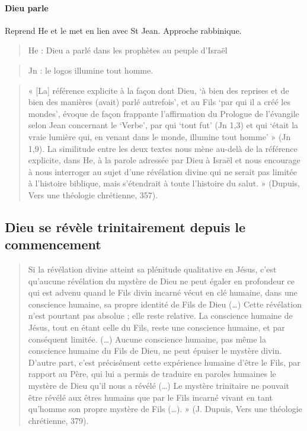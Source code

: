 \paragraph{Dieu parle} Reprend He et le met en lien avec St Jean. Approche rabbinique. 
\begin{quote}
    He : Dieu a parlé dans les prophètes au peuple d'Israël
\end{quote}
\begin{quote}
    Jn : le logos illumine tout homme. 
\end{quote}


 \begin{quote}
 
« [La] référence explicite à la façon dont Dieu, ‘à bien des reprises et de bien des manières (avait)
parlé autrefois’, et au Fils ‘par qui il a créé les mondes’, évoque de façon frappante l’affirmation du
Prologue de l’évangile selon Jean concernant le ‘Verbe’, par qui ‘tout fut’ (Jn 1,3) et qui ‘était la vraie
lumière qui, en venant dans le monde, illumine tout homme’ » (Jn 1,9). La similitude entre les deux
textes nous mène au-delà de la référence explicite, dans He, à la parole adressée par Dieu à Israël et
nous encourage à nous interroger au sujet d’une révélation divine qui ne serait pas limitée à l’histoire
biblique, mais s’étendrait à toute l’histoire du salut. » (Dupuis, Vers une théologie chrétienne, 357).
 \end{quote}







 
\subsection{Dieu se révèle trinitairement depuis le commencement}


\begin{quote}
    Si la révélation divine atteint sa plénitude qualitative en Jésus, c’est qu’aucune révélation du mystère
de Dieu ne peut égaler en profondeur ce qui est advenu quand le Fils divin incarné vécut en clé
humaine, dans une conscience humaine, sa propre identité de Fils de Dieu (…) Cette révélation n’est
pourtant pas absolue ; elle reste relative. La conscience humaine de Jésus, tout en étant celle du Fils,
reste une conscience humaine, et par conséquent limitée. (…) Aucune conscience humaine, pas même
la conscience humaine du Fils de Dieu, ne peut épuiser le mystère divin. D’autre part, c’est
précisément cette expérience humaine d’être le Fils, par rapport au Père, qui lui a permis de traduire en
paroles humaines le mystère de Dieu qu’il nous a révélé (…) Le mystère trinitaire ne pouvait être
révélé aux êtres humains que par le Fils incarné vivant en tant qu’homme son propre mystère de Fils
(…). » (J. Dupuis, Vers une théologie chrétienne, 379).
\end{quote}
 
